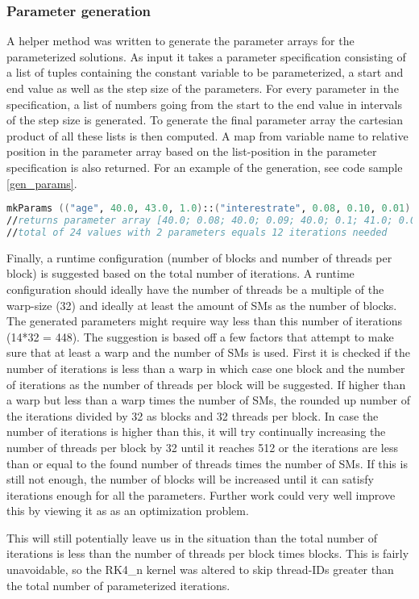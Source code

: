 \subsubsection{Parameter generation}
A helper method was written to generate the parameter arrays for the parameterized solutions.
As input it takes a parameter specification consisting of a list of tuples containing the constant variable to be parameterized, a start and end value as well as the step size of the parameters.
For every parameter in the specification, a list of numbers going from the start to the end value in intervals of the step size is generated.
To generate the final parameter array the cartesian product of all these lists is then computed.
A map from variable name to relative position in the parameter array based on the list-position in the parameter specification is also returned.
For an example of the generation, see code sample \ref{gen_params}.

\begin{lstlisting}[language=fsharp, caption=Parameter generation with the age variable ranging from 40 to 43 and the interest rate variable ranging from 8\% to 10\%, label=gen_params]
mkParams (("age", 40.0, 43.0, 1.0)::("interestrate", 0.08, 0.10, 0.01)::[]);;
//returns parameter array [40.0; 0.08; 40.0; 0.09; 40.0; 0.1; 41.0; 0.08; 41.0; 0.09; 41.0; 0.1; 42.0; 0.08; 42.0; 0.09; 42.0; 0.1; 43.0; 0.08; 43.0; 0.09; 43.0; 0.1]
//total of 24 values with 2 parameters equals 12 iterations needed
\end{lstlisting}

Finally, a runtime configuration (number of blocks and number of threads per block) is suggested based on the total number of iterations.
A runtime configuration should ideally have the number of threads be a multiple of the warp-size (32) and ideally at least the amount of SMs as the number of blocks.
The generated parameters might require way less than this number of iterations (14*32 = 448).
The suggestion is based off a few factors that attempt to make sure that at least a warp and the number of SMs is used.
First it is checked if the number of iterations is less than a warp in which case one block and the number of iterations as the number of threads per block will be suggested.
If higher than a warp but less than a warp times the number of SMs, the rounded up number of the iterations divided by 32 as blocks and 32 threads per block.
In case the number of iterations is higher than this, it will try continually increasing the number of threads per block by 32 until it reaches 512 or the iterations are less than or equal to the found number of threads times the number of SMs.
If this is still not enough, the number of blocks will be increased until it can satisfy iterations enough for all the parameters.
Further work could very well improve this by viewing it as as an optimization problem.

This will still potentially leave us in the situation than the total number of iterations is less than the number of threads per block times blocks.
This is fairly unavoidable, so the RK4\_n kernel was altered to skip thread-IDs greater than the total number of parameterized iterations.
